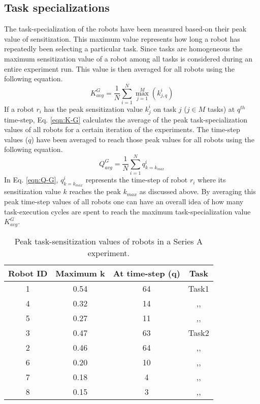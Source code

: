 \subsection*{Task specializations}
The task-specialization of the robots have been measured based-on their peak value of sensitization. This maximum value represents how long a robot has repeatedly been selecting a particular task. Since tasks are homogeneous  the maximum sensitization value of a robot among all tasks is considered during an entire experiment run. This value is then averaged for all robots using the following  equation. 
\begin{equation}
K^G_{avg} = \frac{1}{N}\sum_{i=1}^{N} \max_{j=1}^M\left ( k^i_{j, q} \right ) 
\label{eqn:K-G}
\end{equation}
If a robot $r_i$ has the peak sensitization value $k^i_j$ on task $j$ ($j \in M$ tasks)  at $q^{th}$ time-step, Eq. \ref{eqn:K-G} calculates the average of the peak task-specialization values of all robots for a certain iteration of the experiments.  The time-step values ($q$)  have been averaged to reach those peak values for all robots using the following equation.
\begin{equation}
Q^G_{avg}= \frac{1}{N}\sum_{i=1}^{N} q^i_{k=k_{max}}
\label{eqn:Q-G}
\end{equation}
In Eq. \ref{eqn:Q-G}, $q^i_{k=k_{max}}$ represents the time-step of robot $r_i$  where its sensitization value $k$ reaches the peak $k_{max}$ as discussed above. By averaging this peak time-step values of all robots one can have an overall idea of how many task-execution cycles are spent to reach the maximum task-specialization value $K^G_{avg}$.
\begin{table}
\centering
\caption{Peak task-sensitization values of robots in a Series A experiment.}
\begin{tabular}{|c|c|c|c|}
\hline \textbf{Robot ID} & \textbf{Maximum k} & \textbf{At time-step (q)} & \textbf{Task} \\ 
\hline 1 & 0.54 & 64 & Task1\\
\hline 4 & 0.32 & 14 & ,,\\
\hline 5 & 0.27 & 11 & ,,\\
\hline 3 & 0.47 & 63 & Task2\\
\hline 2 & 0.46 & 64 & ,,\\
\hline 6 & 0.20 & 10 & ,,\\
\hline 7 & 0.18 & 4 & ,,\\
\hline 8 & 0.15 & 3 & ,,\\
\hline 
\end{tabular} 
\label{table:K-G-SA}
\end{table}
